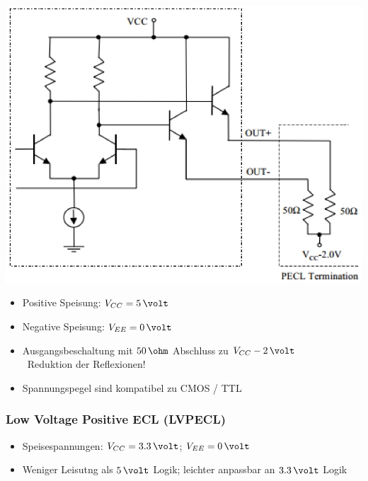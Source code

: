 \begin{minipage}[c]{0.25\columnwidth}
    \includegraphics[width=\columnwidth]{images/PECL.png}
\end{minipage}
\hfill
\begin{minipage}[c]{0.72\columnwidth}
   \begin{itemize}
    \item Positive Speisung: $V_{CC} = 5 \, \volt$
    \item Negative Speisung: $V_{EE} = 0 \, \volt$
    \item Ausgangsbeschaltung mit $50 \, \ohm$ Abschluss zu $V_{CC} - 2 \, \volt$ \\
        \textrightarrow\ Reduktion der Reflexionen!
    \item Spannungspegel sind kompatibel zu CMOS / TTL
   \end{itemize}
\end{minipage}

\subsubsection{Low Voltage Positive ECL (LVPECL)}

\begin{itemize}
    \item Speisespannungen:  $V_{CC} = 3.3 \, \volt$; $V_{EE} = 0 \, \volt$
    \item Weniger Leisutng als $5 \, \volt$ Logik; leichter anpassbar an $3.3 \, \volt$ Logik
\end{itemize}


